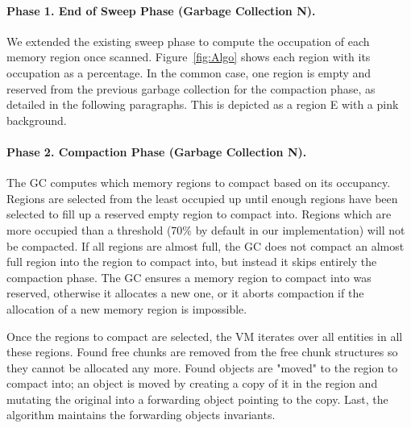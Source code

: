 \documentclass[sigplan,10pt,review,anonymous]{acmart}\settopmatter{printfolios=true,printccs=false,printacmref=false}
\newcommand{\egb}[1]{\color{blue}\fbox{\bfseries\sffamily\scriptsize Elisa:}{\sf\small$\blacktriangleright$\textit{#1}$\blacktriangleleft$}\color{black}}
\begin{document}
\paragraph{Phase 1. End of Sweep Phase (Garbage Collection N).} We extended the existing sweep phase to compute the occupation of each memory region once scanned. 
Figure~\ref{fig:Algo} shows each region with its occupation as a percentage. 
In the common case, one region is empty and reserved from the previous garbage collection for the compaction phase, as detailed in the following paragraphs. 
This is depicted as a region E with a pink background.

\paragraph{Phase 2. Compaction Phase (Garbage Collection N).} The GC computes which memory regions to compact based on its occupancy. Regions are selected from the least occupied up until enough regions have been selected to fill up a reserved empty region to compact into. Regions which are more occupied than a threshold (70\% by default in our implementation) will not be compacted.
If all regions are almost full, the GC does not compact an almost full region into the region to compact into, but instead it skips entirely the compaction phase.
The GC ensures a memory region to compact into was reserved, otherwise it allocates a new one, or it aborts compaction if the allocation of a new memory region is impossible.

Once the regions to compact are selected, the VM iterates over all entities in all these regions. Found free chunks are removed from the free chunk structures so they cannot be allocated any more. Found objects are "moved" to the region to compact into; an object is moved by creating a copy of it in the region and mutating the original into a forwarding object pointing to the copy.
Last, the algorithm maintains the forwarding objects invariants.
\end{document}
